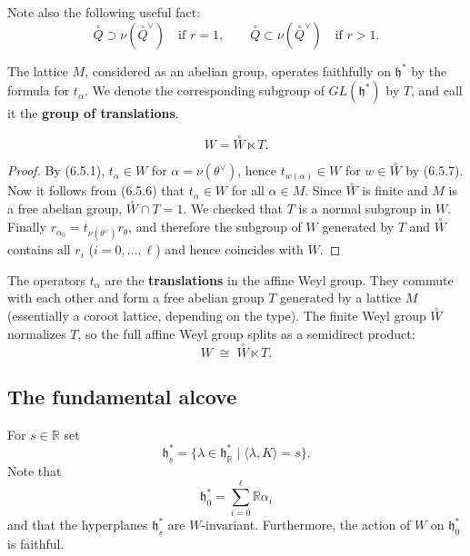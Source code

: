 \documentclass[12pt]{article}
\begin{document}
Note also the following useful fact:
\begin{equation} \label{6.5.9}
    \overset{\circ}{Q} \supset \nu(\overset{\circ}{Q}^\vee) \quad \text{if $r=1$},
    \qquad 
    \overset{\circ}{Q} \subset \nu(\overset{\circ}{Q}^\vee) \quad \text{if $r>1$}.
\end{equation}

The lattice $M$, considered as an abelian group, operates faithfully on $\mathfrak{h}^*$ by the formula for $t_\alpha$. We denote the corresponding subgroup of $GL(\mathfrak{h}^*)$ by $T$, and call it the \textbf{group of translations}.

\begin{proposition}[6.5]
\[
    W = \overset{\circ}{W} \ltimes T.
\]
\end{proposition}

\begin{proof}
By (6.5.1), $t_\alpha \in W$ for $\alpha = \nu(\theta^\vee)$, hence 
$t_{w(\alpha)} \in W$ for $w \in \overset{\circ}{W}$ by (6.5.7). Now it follows from (6.5.6) that 
$t_\alpha \in W$ for all $\alpha \in M$. Since $\overset{\circ}{W}$ is finite and $M$ is a free abelian 
group, $\overset{\circ}{W} \cap T = 1$. We checked that $T$ is a normal subgroup in $W$. Finally $r_{\alpha_0} = t_{\nu(\theta^\vee)} r_\theta$, and therefore the subgroup of $W$ 
generated by $T$ and $\overset{\circ}{W}$ contains all $r_i$ ($i=0,\dots,\ell$) and hence coincides 
with $W$.
\end{proof}


\begin{remark}
    The operators $t_\alpha$ are the \textbf{translations} in the affine Weyl group. They commute with each other and form a free abelian group $T$ generated by a lattice $M$ (essentially a coroot lattice, depending on the type). The finite Weyl group $\overset{\circ}{W}$ normalizes $T$, so the full affine Weyl group  splits as a semidirect product:
\[
    W \;\cong\; \overset{\circ}{W} \ltimes T.
\]
\end{remark}

\subsection{The fundamental alcove}
For $s \in \mathbb{R}$ set
\[
    \mathfrak{h}^*_s = \{\lambda \in \mathfrak{h}^*_\mathbb{R} \mid \langle \lambda, K\rangle = s\}.
\]
Note that 
\[
    \mathfrak{h}^*_0 = \sum_{i=0}^\ell \mathbb{R}\alpha_i
\]
and that the hyperplanes $\mathfrak{h}^*_s$ are $W$-invariant. Furthermore, the action of $W$ on $\mathfrak{h}^*_0$ is faithful.
\end{document}
